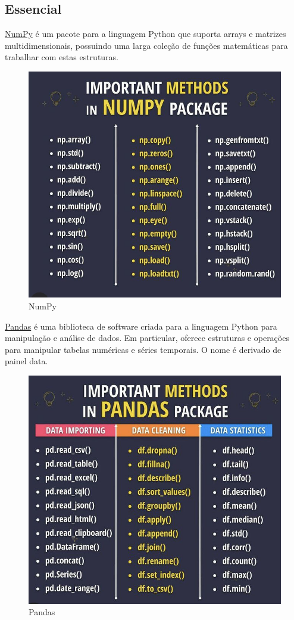 \subsection*{Essencial}

\underline{NumPy} é um pacote para a linguagem Python que suporta arrays e matrizes multidimensionais, possuindo uma larga coleção de funções matemáticas para trabalhar com estas estruturas.

\begin{figure}[!htp]
    \centering
    \includegraphics[scale=.8]{../img/python/numpy.jpeg}
    \caption{NumPy}
    \label{img:numpy}
\end{figure}


\underline{Pandas} é uma biblioteca de software criada para a linguagem Python para manipulação e análise de dados. 
Em particular, oferece estruturas e operações para manipular tabelas numéricas e séries temporais. 
O nome é derivado de painel data.

\begin{figure}[!htp]
    \centering
    \includegraphics[scale=.8]{../img/python/pandas.jpeg}
    \caption{Pandas}
    \label{img:pandas}
\end{figure}
